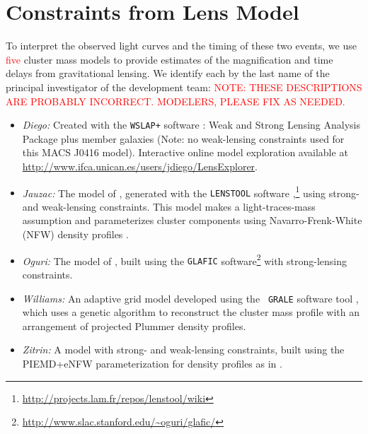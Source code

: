 \section{Constraints from Lens Model}\label{sec:LensingModels}

To interpret the observed light curves and the timing of these two
events, we use \textcolor{red}{five} cluster mass models to provide
estimates of the magnification and time delays from gravitational
lensing.  We identify each by the last name of the principal
investigator of the development team:
\textcolor{red}{NOTE: THESE DESCRIPTIONS ARE PROBABLY INCORRECT.
  MODELERS, PLEASE FIX AS NEEDED.}


\bigskip
\begin{itemize}
\item{\it Diego:} Created with the {\tt WSLAP+} software
  \citep{Sendra:2014}: Weak and Strong Lensing Analysis Package plus
  member galaxies (Note: no weak-lensing constraints used for this
  MACS J0416 model). Interactive online model exploration available at
  \url{http://www.ifca.unican.es/users/jdiego/LensExplorer}.
\item{{\it Jauzac:} The model of \citet{Jauzac:2014}, generated with
  the {\tt LENSTOOL} software
  \citep{Jullo:2007},\footnote{\url{http://projects.lam.fr/repos/lenstool/wiki}}}
  using strong- and weak-lensing constraints.  This model makes a
  light-traces-mass assumption and parameterizes cluster components
  using Navarro-Frenk-White (NFW) density profiles
  \citep{Navarro:1997}.
\item{\it Oguri:} The model of \citet{Kawamata:2015}, built using the
  {\tt GLAFIC}
  software\footnote{\url{http://www.slac.stanford.edu/~oguri/glafic/}}
  with strong-lensing constraints.
\item{{\it Williams:} An adaptive grid model developed using the {\tt
    GRALE} software tool
  \citep{Liesenborgs:2006,Liesenborgs:2007,Mohammed:2014}, which uses
  a genetic algorithm to reconstruct the cluster mass profile with an
  arrangement of projected Plummer \citeyear{Plummer:1911} density
  profiles.}
\item{{\it Zitrin:} A model with strong- and weak-lensing constraints,
  built using the PIEMD+eNFW parameterization for density profiles as
  in \citet{Zitrin:2009a}.}
\end{itemize}
\bigskip    



